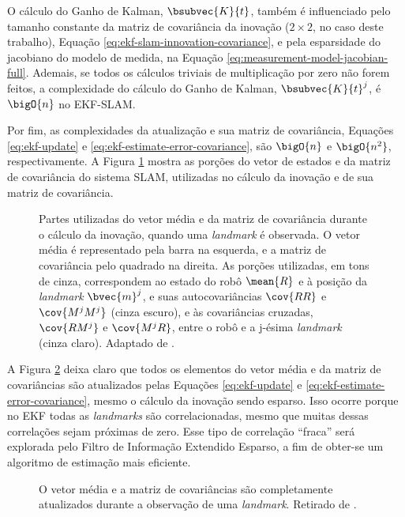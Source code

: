 O cálculo do Ganho de Kalman, $\bsubvec{K}{t}$, também é influenciado pelo 
tamanho constante da matriz de covariância da inovação ($2\times 2$, no caso deste trabalho), Equação \ref{eq:ekf-slam-innovation-covariance}, e pela esparsidade do jacobiano do modelo de medida, na Equação \ref{eq:measurement-model-jacobian-full}. Ademais, se todos os cálculos triviais de multiplicação por zero não forem feitos, a complexidade do cálculo do Ganho de Kalman, $\bsubvec{K}{t}^j$, é $\bigO{n}$ no EKF-SLAM.

Por fim, as complexidades da atualização e sua matriz de covariância, Equações \ref{eq:ekf-update} e \ref{eq:ekf-estimate-error-covariance}, são $\bigO{n}$ e $\bigO{n^2}$, respectivamente. A Figura \ref{fig:ekf-slam-innovation} mostra as porções 
do vetor de estados e da matriz de covariância do sistema SLAM, utilizadas no cálculo da inovação e de sua matriz de covariância.

\begin{figure}[h]
  \centering
  
  \caption{Partes utilizadas do vetor média e da matriz de covariância durante o cálculo da inovação, quando uma \textit{landmark} é observada. O vetor média é representado pela barra na esquerda, e a matriz de covariância pelo quadrado na direita. As porções utilizadas, em tons de cinza, correspondem ao estado do robô $\mean{R}$ e à posição da \textit{landmark} $\bvec{m}^j$, e suas autocovariâncias $\cov{RR}$ e $\cov{M^j M^j}$ (cinza escuro), e às covariâncias cruzadas, $\cov{RM^j}$ e $\cov{M^jR}$, entre o robô e a j-ésima \textit{landmark} (cinza claro). Adaptado de \cite[p.~8]{jsola}.}
  \label{fig:ekf-slam-innovation}
\end{figure}

A Figura \ref{fig:ekf-slam-update} deixa claro que todos os elementos do vetor média e da 
matriz de covariâncias são atualizados pelas Equações \ref{eq:ekf-update} e \ref{eq:ekf-estimate-error-covariance}, mesmo o cálculo da inovação sendo esparso. Isso ocorre porque no EKF todas as \textit{landmarks} são 
correlacionadas, mesmo que muitas dessas correlações sejam próximas de zero. 
Esse tipo de correlação ``fraca'' será explorada pelo Filtro de Informação Extendido Esparso, a fim de obter-se um algoritmo de estimação mais eficiente.

\begin{figure}[h]
  \centering
  
  \caption{O vetor média e a matriz de covariâncias são completamente atualizados durante a observação de uma \textit{landmark}. Retirado de \cite[p.~8]{jsola}.}
  \label{fig:ekf-slam-update}
\end{figure}

